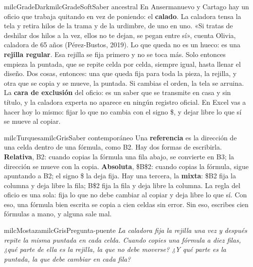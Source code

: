 \documentclass[11pt,letterpaper]{article}
\begin{document}
\begin{softbox}{milcGradeDark}{milcGradeSoft}{Saber ancestral}
En Ansermanuevo y Cartago hay un oficio que trabaja quitando en vez de poniendo: el \textbf{calado}. La caladora tensa la tela y retira hilos de la trama y de la urdimbre, de uno en uno. «Si tratas de deshilar dos hilos a la vez, ellos no te dejan, se pegan entre sí», cuenta Olivia, caladora de 65 años (Pérez-Bustos, 2019). Lo que queda no es un hueco: es una \textbf{rejilla regular}. Esa rejilla se fija primero y no se toca más. Solo entonces empieza la puntada, que se repite celda por celda, siempre igual, hasta llenar el diseño. Dos cosas, entonces: una que queda fija para toda la pieza, la rejilla, y otra que se copia y se mueve, la puntada. Si cambias el orden, la tela se arruina. La \textbf{cara de exclusión} del oficio: es un saber que se transmite en casa y sin título, y la caladora experta no aparece en ningún registro oficial. En Excel vas a hacer hoy lo mismo: fijar lo que no cambia con el signo \$, y dejar libre lo que sí se mueve al copiar.\par{}
\end{softbox}

\begin{softbox}{milcTurquesa}{milcGris}{Saber contemporáneo}
Una \textbf{referencia} es la dirección de una celda dentro de una fórmula, como B2. Hay dos formas de escribirla. \textbf{Relativa}, B2: cuando copias la fórmula una fila abajo, se convierte en B3; la dirección se mueve con la copia. \textbf{Absoluta}, \$B\$2: cuando copias la fórmula, sigue apuntando a B2; el signo \$ la deja fija. Hay una tercera, la \textbf{mixta}: \$B2 fija la columna y deja libre la fila; B\$2 fija la fila y deja libre la columna. La regla del oficio es una sola: fija lo que no debe cambiar al copiar y deja libre lo que sí. Con eso, una fórmula bien escrita se copia a cien celdas sin error. Sin eso, escribes cien fórmulas a mano, y alguna sale mal.
\end{softbox}

\begin{softbox}{milcMostaza}{milcGris}{Pregunta-puente}
\textit{La caladora fija la rejilla una vez y después repite la misma puntada en cada celda. Cuando copies una fórmula a diez filas, ¿qué parte de ella es la rejilla, la que no debe moverse? ¿Y qué parte es la puntada, la que debe cambiar en cada fila?}
\end{softbox}
\end{document}
